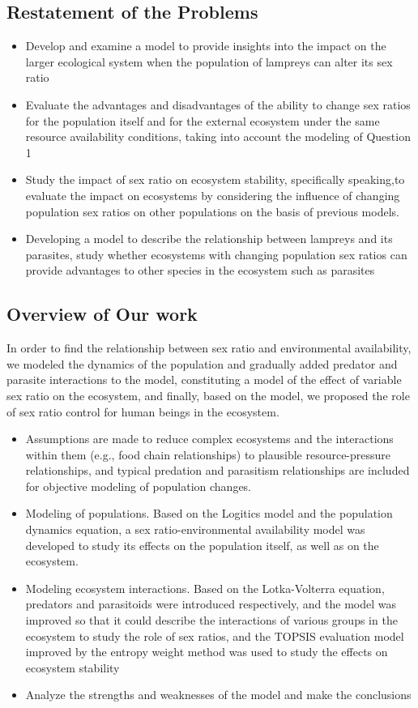 \documentclass[12pt]{article}  %
\begin{document}
\subsection{Restatement of the Problems}

\begin{itemize}
	\item Develop and examine a model to provide insights into the impact on the larger ecological system when the population of lampreys can alter its sex ratio
	\item Evaluate the advantages and disadvantages of the ability to change sex ratios for the population itself and for the external ecosystem under the same resource availability conditions, taking into account the modeling of Question 1
	\item Study the impact of sex ratio on ecosystem stability, specifically speaking,to evaluate the impact on ecosystems by considering the influence of changing population sex ratios on other populations on the basis of previous models.
	\item Developing a model to describe the relationship between lampreys and its parasites, study whether ecosystems with changing population sex ratios can provide advantages to other species in the ecosystem such as parasites
\end{itemize}

\subsection{Overview of Our work}
In order to find the relationship between sex ratio and environmental availability, we modeled the dynamics of the population and gradually added predator and parasite interactions to the model, constituting a model of the effect of variable sex ratio on the ecosystem, and finally, based on the model, we proposed the role of sex ratio control for human beings in the ecosystem.


\begin{itemize}
	\item Assumptions are made to reduce complex ecosystems and the interactions within them (e.g., food chain relationships) to plausible resource-pressure relationships, and typical predation and parasitism relationships are included for objective modeling of population changes.
	\item Modeling of populations. Based on the Logitics model and the population dynamics equation, a sex ratio-environmental availability model was developed to study its effects on the population itself, as well as on the ecosystem.
	\item Modeling ecosystem interactions. Based on the Lotka-Volterra equation, predators and parasitoids were introduced respectively, and the model was improved so that it could describe the interactions of various groups in the ecosystem to study the role of sex ratios, and the TOPSIS evaluation model improved by the entropy weight method was used to study the effects on ecosystem stability
	\item Analyze the strengths and weaknesses of the model and make the conclusions
\end{itemize}
\end{document}
